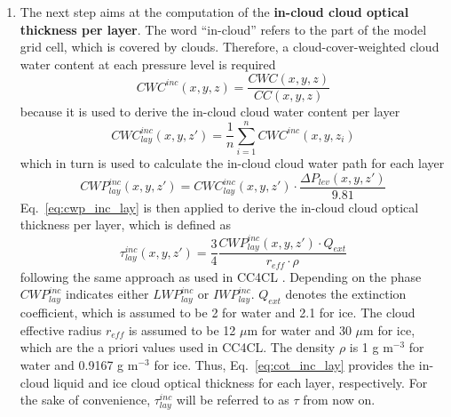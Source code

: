 \begin{enumerate}[label=(\alph*)]
  \item\label{it:cot_inc_lay} 
The next step aims at the computation of the
\textbf{in-cloud cloud optical thickness per layer}.
The word ``in-cloud'' refers to the part of the model grid cell, which is covered by clouds. 
Therefore, a cloud-cover-weighted cloud water content at each pressure level is required
\begin{equation}\label{eq:incloud-cwc}
   CWC^{inc}(x,y,z) = \frac{CWC(x,y,z)}{CC(x,y,z)}
\end{equation}
because it is used to derive the in-cloud cloud water content per layer
\begin{equation}\label{eq:cwc_inc_lay}
  CWC^{inc}_{lay}(x,y,z') = \frac{1}{n} \sum\limits_{i=1}^n CWC^{inc}(x,y,z_{i})
\end{equation}
which in turn is used to calculate the in-cloud cloud water path for each layer
\begin{equation}\label{eq:cwp_inc_lay}
  CWP^{inc}_{lay}(x,y,z') = CWC^{inc}_{lay}(x,y,z') \cdotp \frac{\Delta P_{lev}(x,y,z')}{9.81}
\end{equation}
Eq.~\ref{eq:cwp_inc_lay} is then applied to derive the 
in-cloud cloud optical thickness per layer, which is defined as
\begin{equation}\label{eq:cot_inc_lay}
  \tau^{inc}_{lay}(x,y,z') = \frac{3}{4} \frac{CWP^{inc}_{lay}(x,y,z') \cdotp Q_{ext}}{r_{eff} \cdotp \rho}
\end{equation}
following the same approach as used in CC4CL \cite{Han94}.
Depending on the phase $CWP^{inc}_{lay}$ indicates either $LWP^{inc}_{lay}$ or
$IWP^{inc}_{lay}$. $Q_{ext}$ denotes the extinction coefficient, which is assumed to be 2
for water and 2.1 for ice. 
\color{red}The cloud effective radius $r_{eff}$ is assumed to be 12 $\mu$m
for water and 30 $\mu$m for ice, which are the a priori values used in CC4CL. \color{black}
The density $\rho$ is 1 g m$^{-3}$ for water and 0.9167 g m$^{-3}$ for ice.
Thus, Eq.~\ref{eq:cot_inc_lay} provides the in-cloud liquid and ice 
cloud optical thickness for each layer, respectively.
For the sake of convenience, $\tau^{inc}_{lay}$ will be referred to as $\tau$ from now on. 


\end{enumerate}
